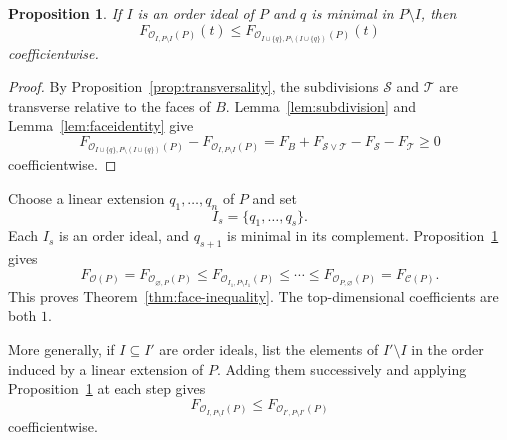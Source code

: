 \documentclass[a4paper,12pt]{amsart}
\newtheorem{proposition}[theorem]{Proposition}
\theoremstyle{definition}
\theoremstyle{remark}
\newcommand{\OO}{\mathcal O}
\newcommand{\CC}{\mathcal C}
\begin{document}
\begin{proposition}\label{prop:step}
If $I$ is an order ideal of $P$ and $q$ is minimal in $P\setminus I$,
then
\[
 F_{\OO_{I,P\setminus I}(P)}(t)  \leq  F_{\OO_{I\cup\{q\},P\setminus(I\cup\{q\})}(P)}(t)
\]
coefficientwise.
\end{proposition}

\begin{proof}
By Proposition~\ref{prop:transversality}, the subdivisions $\mathcal S$ and $\mathcal T$ are transverse relative to the faces of $B$.
Lemma~\ref{lem:subdivision} and Lemma~\ref{lem:faceidentity} give
\[
 F_{\OO_{I\cup\{q\},P\setminus(I\cup\{q\})}(P)}-F_{\OO_{I,P\setminus I}(P)}
 =  F_B+F_{\mathcal S\vee\mathcal T}  -F_{\mathcal S}-F_{\mathcal T}  \geq0
\]
coefficientwise.
\end{proof}

Choose a linear extension $q_1,\ldots,q_n$ of $P$ and set
\[
 I_s=\{q_1,\ldots,q_s\}.
\]
Each $I_s$ is an order ideal, and $q_{s+1}$ is minimal in its complement. Proposition~\ref{prop:step} gives
\[
 F_{\OO(P)}  =  F_{\OO_{\varnothing,P}(P)}  \leq  F_{\OO_{I_1,P\setminus I_1}(P)}  
 \leq\cdots\leq  F_{\OO_{P,\varnothing}(P)}  = F_{\CC(P)}.
\]
This proves Theorem~\ref{thm:face-inequality}. 
The top-dimensional coefficients are both $1$.

More generally, if $I\subseteq I'$ are order ideals, list the elements of $I'\setminus I$ in the order induced by a linear extension of $P$.
Adding them successively and applying Proposition~\ref{prop:step} at each step gives
\[
 F_{\OO_{I,P\setminus I}(P)}\leq F_{\OO_{I',P\setminus I'}(P)}
\]
coefficientwise.
\printbibliography
\end{document}
